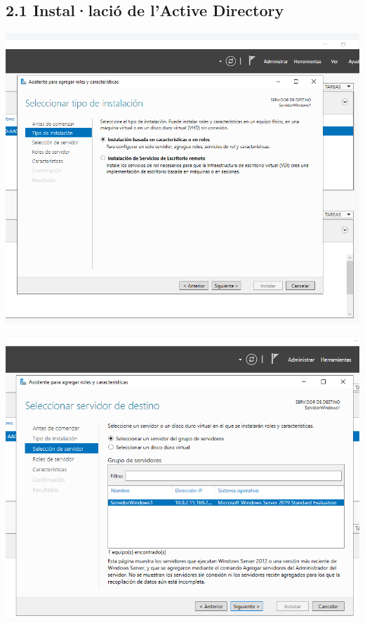 \documentclass[
  a4paper,
]{article}
\begin{document}
\subsection{2.1 Instal·lació de l'Active
Directory}\label{installaciuxf3-de-lactive-directory}

\includegraphics{png/instalAD1.png}

\includegraphics{png/instalAD2.png}
\end{document}
